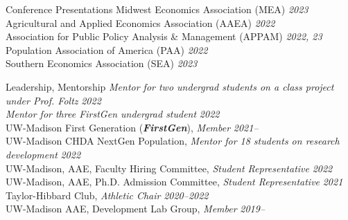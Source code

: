 \documentclass{resume} %
\begin{document}
\begin{rSection}{Conference Presentations} 
	Midwest Economics Association (MEA) {\hfill \em 2023}\\
	Agricultural and Applied Economics Association (AAEA) {\hfill \em 2022}\\
	Association for Public Policy Analysis \& Management (APPAM) {\hfill \em 2022, 23} \\
	Population Association of America (PAA) {\hfill \em 2022} \\
	Southern Economics Association (SEA) {\hfill \em 2023} 





	
	
	
	
	
	
\end{rSection}
	
\begin{rSection}{Leadership, Mentorship}%
\textit{Mentor for two undergrad students on a class project under Prof. Foltz} {\hfill\textit{2022}}\\ 
\textit{Mentor for three FirstGen undergrad student} {\hfill\textit{2022}}\\
UW-Madison First Generation (\textbf{\textit{FirstGen}}), \textit{Member} {\hfill\textit{ 2021--}}\\
UW-Madison CHDA NextGen Population, \textit{Mentor for 18 students on research development} {\hfill\textit{2022}}\\
UW-Madison, AAE, Faculty Hiring Committee, \textit{Student Representative} {\hfill \textit{2022}}\\
UW-Madison, AAE, Ph.D. Admission Committee, \textit{Student Representative} {\hfill \textit{2021}}\\
Taylor-Hibbard Club, \textit{Athletic Chair} {\hfill \textit{2020--2022}} \\
UW-Madison AAE, Development Lab Group, \textit{Member} {\hfill \textit{2019--}}
\end{rSection}
\end{document}
